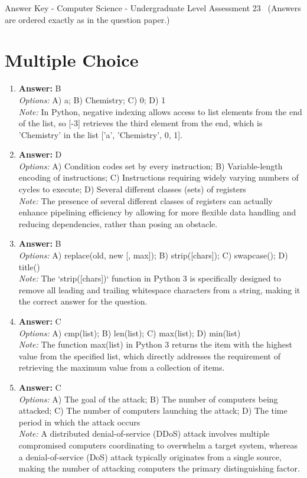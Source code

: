 \documentclass[12pt]{article}
\begin{document}
\begin{center}
Answer Key - Computer Science - Undergraduate Level Assessment 23 \
\small (Answers are ordered exactly as in the question paper.)
\end{center}

\section*{Multiple Choice}
\begin{enumerate}[label=\arabic*.]
\item \textbf{Answer:} B
\\ \textit{Options:} A) a; B) Chemistry; C) 0; D) 1
\\ \textit{Note:} In Python, negative indexing allows access to list elements from the end of the list, so [-3] retrieves the third element from the end, which is 'Chemistry' in the list ['a', 'Chemistry', 0, 1].
\item \textbf{Answer:} D
\\ \textit{Options:} A) Condition codes set by every instruction; B) Variable-length encoding of instructions; C) Instructions requiring widely varying numbers of cycles to execute; D) Several different classes (sets) of registers
\\ \textit{Note:} The presence of several different classes of registers can actually enhance pipelining efficiency by allowing for more flexible data handling and reducing dependencies, rather than posing an obstacle.
\item \textbf{Answer:} B
\\ \textit{Options:} A) replace(old, new [, max]); B) strip([chars]); C) swapcase(); D) title()
\\ \textit{Note:} The `strip([chars])` function in Python 3 is specifically designed to remove all leading and trailing whitespace characters from a string, making it the correct answer for the question.
\item \textbf{Answer:} C
\\ \textit{Options:} A) cmp(list); B) len(list); C) max(list); D) min(list)
\\ \textit{Note:} The function max(list) in Python 3 returns the item with the highest value from the specified list, which directly addresses the requirement of retrieving the maximum value from a collection of items.
\item \textbf{Answer:} C
\\ \textit{Options:} A) The goal of the attack; B) The number of computers being attacked; C) The number of computers launching the attack; D) The time period in which the attack occurs
\\ \textit{Note:} A distributed denial-of-service (DDoS) attack involves multiple compromised computers coordinating to overwhelm a target system, whereas a denial-of-service (DoS) attack typically originates from a single source, making the number of attacking computers the primary distinguishing factor.
\end{enumerate}
\end{document}
